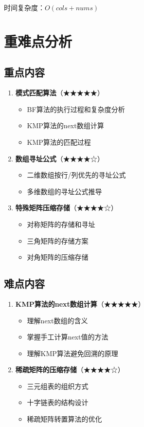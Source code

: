 \documentclass[12pt,a4paper]{amsart}
\begin{document}
时间复杂度：$O(cols + nums)$

\section{重难点分析}

\subsection{重点内容}
\begin{enumerate}
\item \textbf{模式匹配算法}（★★★★★）
    \begin{itemize}
    \item BF算法的执行过程和复杂度分析
    \item KMP算法的next数组计算
    \item KMP算法的匹配过程
    \end{itemize}
    
\item \textbf{数组寻址公式}（★★★★☆）
    \begin{itemize}
    \item 二维数组按行/列优先的寻址公式
    \item 多维数组的寻址公式推导
    \end{itemize}
    
\item \textbf{特殊矩阵压缩存储}（★★★★☆）
    \begin{itemize}
    \item 对称矩阵的存储和寻址
    \item 三角矩阵的存储方案
    \item 对角矩阵的压缩存储
    \end{itemize}
\end{enumerate}

\subsection{难点内容}
\begin{enumerate}
\item \textbf{KMP算法的next数组计算}（★★★★★）
    \begin{itemize}
    \item 理解next数组的含义
    \item 掌握手工计算next值的方法
    \item 理解KMP算法避免回溯的原理
    \end{itemize}
    
\item \textbf{稀疏矩阵的压缩存储}（★★★★☆）
    \begin{itemize}
    \item 三元组表的组织方式
    \item 十字链表的结构设计
    \item 稀疏矩阵转置算法的优化
    \end{itemize}
\end{enumerate}
\end{document}
